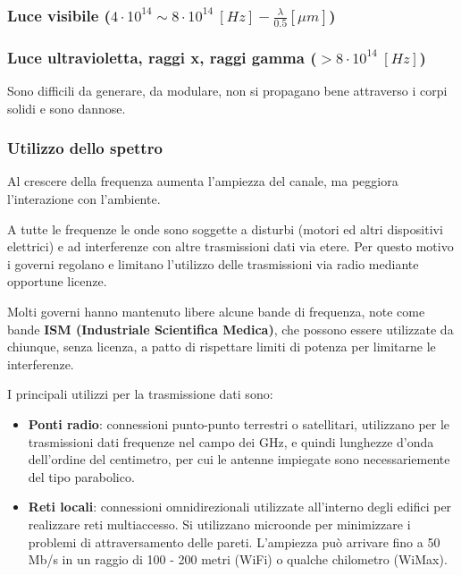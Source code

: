         \subsubsection{Luce visibile ($4 \cdot 10^{14}\sim8 \cdot 10^{14} ~[Hz] - \frac{\lambda}{0.5}[\mu m]$)}
        
        \subsubsection{Luce ultravioletta, raggi x, raggi gamma ($>8 \cdot 10^{14} ~[Hz]$)}
            Sono difficili da generare, da modulare, non si propagano bene attraverso i corpi solidi e sono dannose.

        \subsubsection{Utilizzo dello spettro}
            Al crescere della frequenza aumenta l'ampiezza del canale, ma peggiora l'interazione con l'ambiente.

            A tutte le frequenze le onde sono soggette a disturbi (motori ed altri dispositivi elettrici) e ad interferenze con altre trasmissioni dati via etere. Per questo motivo i governi regolano e limitano l'utilizzo delle trasmissioni via radio mediante opportune licenze.

            Molti governi hanno mantenuto libere alcune bande di frequenza, note come bande \textbf{ISM (Industriale Scientifica Medica)}, che possono essere utilizzate da chiunque, senza licenza, a patto di rispettare limiti di potenza per limitarne le interferenze.

            I principali utilizzi per la trasmissione dati sono:
            \begin{itemize}
                \item \textbf{Ponti radio}: connessioni punto-punto terrestri o satellitari, utilizzano per le trasmissioni dati frequenze nel campo dei GHz, e quindi lunghezze d'onda dell'ordine del centimetro, per cui le antenne impiegate sono necessariemente del tipo parabolico.
                \item \textbf{Reti locali}: connessioni omnidirezionali utilizzate all'interno degli edifici per realizzare reti multiaccesso. Si utilizzano microonde per minimizzare i problemi di attraversamento delle pareti. L'ampiezza può arrivare fino a 50 Mb/s in un raggio di 100 - 200 metri (WiFi) o qualche chilometro (WiMax).
            \end{itemize}

